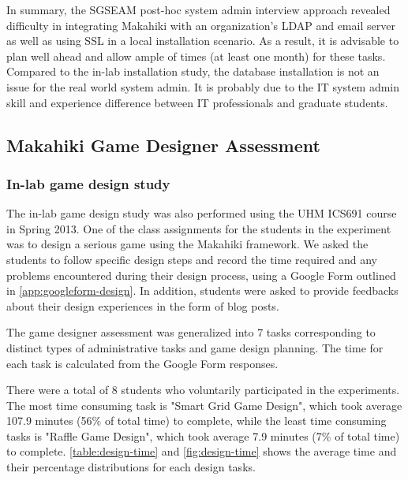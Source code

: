 In summary, the SGSEAM post-hoc system admin interview approach revealed difficulty in integrating Makahiki with an organization's LDAP and email server as well as using SSL in a local installation scenario. As a result, it is advisable to plan well ahead and allow ample of times (at least one month) for these tasks.  Compared to the in-lab installation study, the database installation is not an issue for the real world system admin. It is probably due to the IT system admin skill and experience difference between  IT professionals and graduate students. 

\subsection{Makahiki Game Designer Assessment}

\subsubsection{In-lab game design study}
\label{sec:designer-in-lab-result}

The in-lab game design study was also performed using the UHM ICS691 course in Spring 2013. One of the class assignments for the students in the experiment was to design a serious game using the Makahiki framework. We asked the students to follow specific design steps and record the time required and any problems encountered during their design process, using a Google Form outlined in \autoref{app:googleform-design}. In addition, students were asked to provide feedbacks about their
design experiences in the form of blog posts. 

The game designer assessment was generalized into 7 tasks corresponding to
distinct types of administrative tasks and game design planning. The time for each task is
calculated from the Google Form responses. 

There were a total of 8 students who voluntarily participated in the experiments. The most time consuming task is "Smart Grid Game Design", which took average 107.9 minutes (56\% of total time) to complete, while the least time consuming tasks is "Raffle Game Design", which took average 7.9 minutes (7\% of total time) to complete. \autoref{table:design-time} and \autoref{fig:design-time} shows the average time and their percentage distributions for each design tasks.

